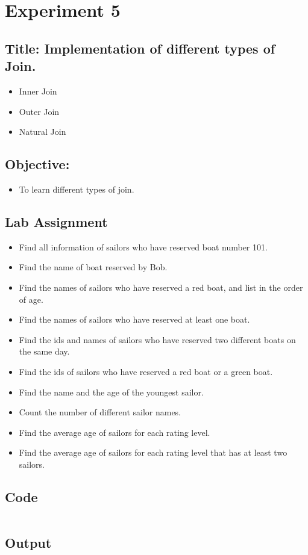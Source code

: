 \documentclass{article}
\begin{document}
\section*{Experiment 5}
\subsection*{\textbf{Title:} Implementation of different types of Join.}
\begin{itemize}
	\item Inner Join
	\item Outer Join
	\item Natural Join
\end{itemize}
\subsection*{\textbf{Objective:}}
\begin{itemize}
	\item To learn different types of join.
\end{itemize}
\subsection*{Lab Assignment}
\begin{itemize}
	\item Find all information of sailors who have reserved boat number 101.
	\item Find the name of boat reserved by Bob.
	\item Find the names of sailors who have reserved a red boat, and list in the order of age.
	\item Find the names of sailors who have reserved at least one boat.
	\item Find the ids and names of sailors who have reserved two different boats on the same day.
	\item Find the ids of sailors who have reserved a red boat or a green boat.
	\item Find the name and the age of the youngest sailor.
	\item Count the number of different sailor names.
	\item Find the average age of sailors for each rating level.
	\item Find the average age of sailors for each rating level that has at least two sailors.
\end{itemize}
\subsection*{Code}
\inputminted{sql}{code/5.sql}
\subsection*{Output}

\end{document}
